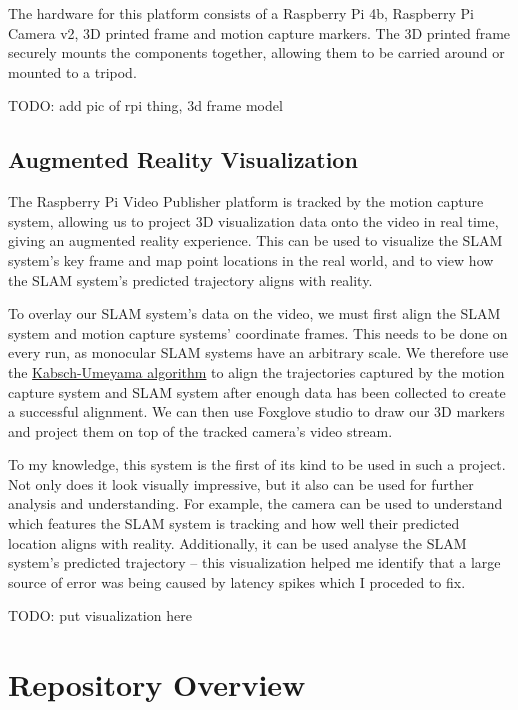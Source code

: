 The hardware for this platform consists of a Raspberry Pi 4b, Raspberry Pi Camera v2, 3D printed frame and motion capture markers. The 3D printed frame securely mounts the components together, allowing them to be carried around or mounted to a tripod.

TODO: add pic of rpi thing, 3d frame model

\subsection{Augmented Reality Visualization}
\label{sec:augmented-reality-visualization}
The Raspberry Pi Video Publisher platform is tracked by the motion capture system, allowing us to project 3D visualization data onto the video in real time, giving an augmented reality experience. This can be used to visualize the SLAM system's key frame and map point locations in the real world, and to view how the SLAM system's predicted trajectory aligns with reality.

To overlay our SLAM system's data on the video, we must first align the SLAM system and motion capture systems' coordinate frames. This needs to be done on every run, as monocular SLAM systems have an arbitrary scale. We therefore use the \hyperref[sec:kabsch-umeyama-algorithm]{Kabsch-Umeyama algorithm} to align the trajectories captured by the motion capture system and SLAM system after enough data has been collected to create a successful alignment. We can then use Foxglove studio to draw our 3D markers and project them on top of the tracked camera's video stream.

To my knowledge, this system is the first of its kind to be used in such a project. Not only does it look visually impressive, but it also can be used for further analysis and understanding. For example, the camera can be used to understand which features the SLAM system is tracking and how well their predicted location aligns with reality. Additionally, it can be used analyse the SLAM system's predicted trajectory – this visualization helped me identify that a large source of error was being caused by latency spikes which I proceded to fix.

TODO: put visualization here

\section{Repository Overview}
\label{sec:repository-overview}
